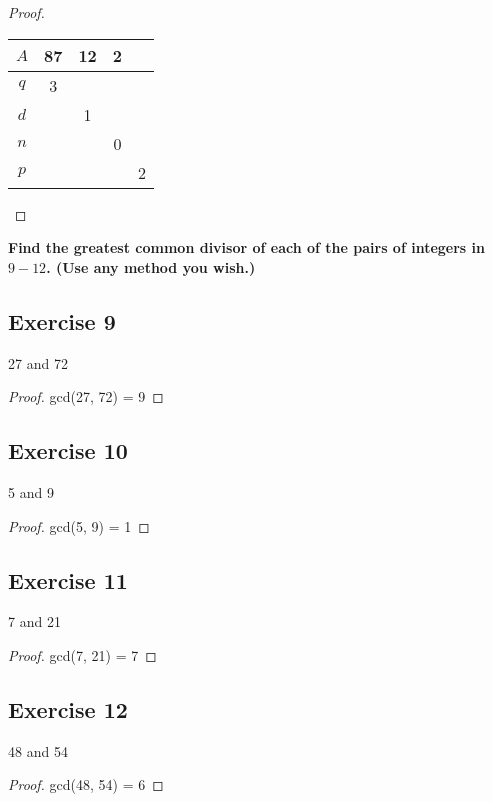 \documentclass[14pt]{extarticle}
\newcommand{\cy}{\color{cyan}}
\begin{document}
\begin{proof}
    \begin{center}
        \begin{tabular}{|c|c|c|c|c|}
            \hline
            $A$ & 87 & 12 & 2 &   \\
            \hline
            $q$ & 3  &    &   &   \\
            \hline
            $d$ &    & 1  &   &   \\
            \hline
            $n$ &    &    & 0 &   \\
            \hline
            $p$ &    &    &   & 2 \\
            \hline
        \end{tabular}
    \end{center}
\end{proof}

{\bf \cy Find the greatest common divisor of each of the pairs of integers in $9-12$. (Use any method you wish.)}

\subsection{Exercise 9}
27 and 72

\begin{proof}
    gcd(27, 72) = 9
\end{proof}

\subsection{Exercise 10}
5 and 9

\begin{proof}
    gcd(5, 9) = 1
\end{proof}

\subsection{Exercise 11}
7 and 21

\begin{proof}
    gcd(7, 21) = 7
\end{proof}

\subsection{Exercise 12}
48 and 54

\begin{proof}
    gcd(48, 54) = 6
\end{proof}
\end{document}
